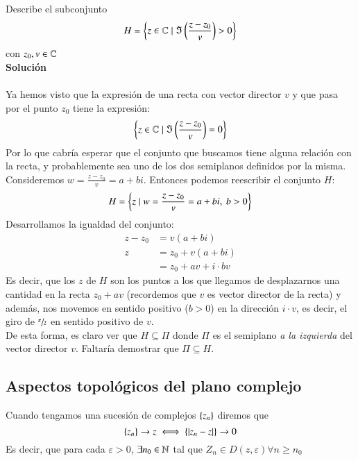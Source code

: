     \begin{th_ex}
        Describe el subconjunto
        $$
            H = \left\{z \in \mathbb{C} \mid \Im\left(\frac{z-z_0}{v}\right) > 0\right\}
        $$
        con $z_0, v \in  \mathbb{C}$\\

        \textbf{Solución}\\\\

        Ya hemos visto que la expresión de una recta con vector director $v$ y que pasa por el punto $z_0$ tiene la expresión:
        $$
            \left\{z \in \mathbb{C} \mid \Im\left(\frac{z-z_0}{v}\right) = 0\right\}
        $$
        Por lo que cabría esperar que el conjunto que buscamos tiene alguna relación con la recta, y probablemente sea uno de los dos semiplanos definidos por la misma.\\
        Consideremos $w = \frac{z-z_0}{v} = a + bi$. Entonces podemos reescribir el conjunto $H$:
        $$
            H = \left\{z \mid w = \frac{z-z_0}{v} = a + bi,\ b>0\right\}
        $$
        Desarrollamos la igualdad del conjunto:
        \begin{align*}
            z - z_0 &= v (a + bi)\\
            z &= z_0 + v(a + bi)\\
                &= z_0 + av + i\cdot bv
        \end{align*}
        Es decir, que los $z$ de $H$ son los puntos a los que llegamos de desplazarnos una cantidad en la recta $z_0 + av$ (recordemos que $v$ es vector director de la recta) y además, nos movemos en sentido positivo ($b>0$) en la dirección $i\cdot v$, es decir, el giro de $\sfrac{\pi}{2}$ en sentido positivo de $v$.\\

        De esta forma, es claro ver que $H \subseteq \Pi$ donde $\Pi$ es el semiplano \textit{a la izquierda} del vector director $v$. Faltaría demostrar que $\Pi \subseteq H$.
    \end{th_ex}


    \subsection{Aspectos topol\'ogicos del plano complejo}
        Cuando tengamos una sucesión de complejos $\left\{z_n\right\}$ diremos que
        $$
            \left\{z_n\right\} \to z \iff \left\{\left|z_n - z\right|\right\} \to 0
        $$
        Es decir, que para cada $\varepsilon > 0$, $\exists n_0 \in \mathbb{N}$ tal que $Z_n \in D(z, \varepsilon) \forall n \geq n_0$

